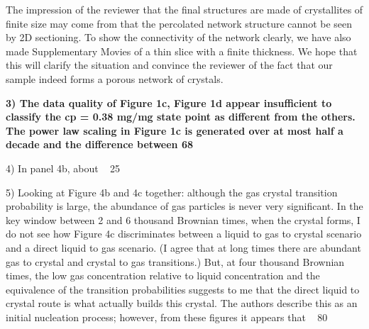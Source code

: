 \documentclass[11pt]{article}
\begin{document}
\bigskip
\doublespacing

The impression of the reviewer that the final structures are made of crystallites of finite size may come from that the percolated network structure cannot be seen by 2D sectioning. To show the connectivity of the network clearly, we have also made Supplementary Movies of a thin slice with a finite thickness. We hope that this will clarify the situation and convince the reviewer of the fact that our sample indeed forms a porous network of crystals. 


\vspace{1em}

\singlespacing

{\bf
3) The data quality of Figure 1c, Figure 1d appear insufficient to classify the cp = 0.38 mg/mg state point as different from the others. The power law scaling in Figure 1c is generated over at most half a decade and the difference between 68%


4) In panel 4b, about ~ 25%



5) Looking at Figure 4b and 4c together: although the gas crystal transition probability is large, the abundance of gas particles is never very significant. In the key window between 2 and 6 thousand Brownian times, when the crystal forms, I do not see how Figure 4c discriminates between a liquid to gas to crystal scenario and a direct liquid to gas scenario. (I agree that at long times there are abundant gas to crystal and crystal to gas transitions.) But, at four thousand Brownian times, the low gas concentration relative to liquid concentration and the equivalence of the transition probabilities suggests to me that the direct liquid to crystal route is what actually builds this crystal. The authors describe this as an initial nucleation process; however, from these figures it appears that ~ 80%



}
\end{document}
